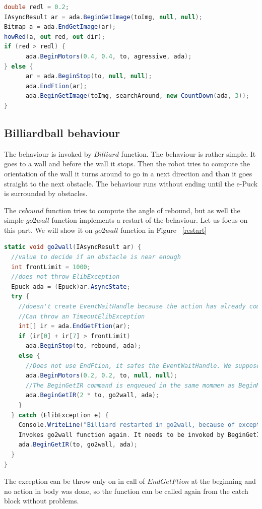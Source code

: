 \documentclass[12pt,notitlepage]{report}
\begin{document}
\begin{lstlisting}[language=cs]
double redl = 0.2;
IAsyncResult ar = ada.BeginGetImage(toImg, null, null);
Bitmap a = ada.EndGetImage(ar);
howRed(a, out red, out dir);
if (red > redl) {
      ada.BeginMotors(0.4, 0.4, to, agressive, ada);
} else {
      ar = ada.BeginStop(to, null, null);
      ada.EndFtion(ar);
      ada.BeginGetImage(toImg, searchAround, new CountDown(ada, 3));
}
\end{lstlisting}
	
\subsection{Billiardball behaviour}\label{billiard}
	The behaviour is invoked by $Billiard$ function. The behaviour is rather simple.
	It goes to a wall and before the wall it stops. Then the robot tries to compute the
	orientation of the wall it turns around to go in a next direction and than it goes straight
	to the next obstacle.
	The behaviour runs without ending until the e-Puck is surrounded by obstacles.

	The $rebound$ function tries to compute the angle of rebound, but as well the simple $go2wall$ function
	implements a restart of the behaviour.
	Let us focus on this part. We will show it on $go2wall$ function in Figure ~\ref{restart}

\begin{lstlisting}[language=cs]
static void go2wall(IAsyncResult ar) {
  //value to decide if an obstacle is near enough
  int frontLimit = 1000;  
  //does not throw ElibException
  Epuck ada = (Epuck)ar.AsyncState;
  try {
    //doesn't create EventWaitHandle because the action has already completed synchronously.
    //Can throw an TimeoutElibException
    int[] ir = ada.EndGetFtion(ar);    
    if (ir[0] + ir[7] > frontLimit)
      ada.BeginStop(to, rebound, ada);
    else {
      //Does not use EndFtion, it safes the EventWaitHandle. We suppose, that it succeeds now or in next rounds.
      ada.BeginMotors(0.2, 0.2, to, null, null);
      //The BeginGetIR command is enqueued in the same mommen as BeginMotors, therefor 2*to.
      ada.BeginGetIR(2 * to, go2wall, ada);
    }
  } catch (ElibException e) {
    Console.WriteLine("Billiard restarted in go2wall, because of exception:\n" + e.Message);
    Invokes go2wall function again. It needs to be invoked by BeginGetIR command, because it expects ar with IR values.
    ada.BeginGetIR(to, go2wall, ada);
  }
}
\end{lstlisting}
	The exception can be throw only on in call of $EndGetFtion$ at the beginning and 
	no action in body was done, so the function can be called again from the catch block without problems.
\end{document}
